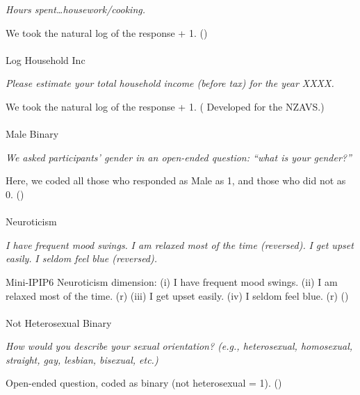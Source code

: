 \documentclass[
  single column]{article}
\makeatletter
\let\oldparagraph\paragraph
\renewcommand{\paragraph}{
    \@ifstar
      \xxxParagraphStar
      \xxxParagraphNoStar
  }
\newcommand{\xxxParagraphStar}[1]{\oldparagraph*{#1}\mbox{}}
\newcommand{\xxxParagraphNoStar}[1]{\oldparagraph{#1}\mbox{}}
\makeatother
\begin{document}
\emph{Hours spent\ldots housework/cooking.}

We took the natural log of the response + 1.
()

\paragraph{Log Household Inc}\label{log-household-inc}

\emph{Please estimate your total household income (before tax) for the
year XXXX.}

We took the natural log of the response + 1.
( Developed for the
NZAVS.)

\paragraph{Male Binary}\label{male-binary}

\emph{We asked participants' gender in an open-ended question: ``what is
your gender?''}

Here, we coded all those who responded as Male as 1, and those who did
not as 0. ()

\paragraph{Neuroticism}\label{neuroticism}

\emph{I have frequent mood swings.} \emph{I am relaxed most of the time
(reversed).} \emph{I get upset easily.} \emph{I seldom feel blue
(reversed).}

Mini-IPIP6 Neuroticism dimension: (i) I have frequent mood swings. (ii)
I am relaxed most of the time. (r) (iii) I get upset easily. (iv) I
seldom feel blue. (r) ()

\paragraph{Not Heterosexual Binary}\label{not-heterosexual-binary}

\emph{How would you describe your sexual orientation? (e.g.,
heterosexual, homosexual, straight, gay, lesbian, bisexual, etc.)}

Open-ended question, coded as binary (not heterosexual = 1).
()
\end{document}
